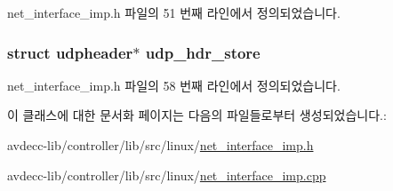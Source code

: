 net\+\_\+interface\+\_\+imp.\+h 파일의 51 번째 라인에서 정의되었습니다.

\subsubsection[{\texorpdfstring{udp\+\_\+hdr\+\_\+store}{udp_hdr_store}}]{\setlength{\rightskip}{0pt plus 5cm}struct {\bf udpheader}$\ast$ udp\+\_\+hdr\+\_\+store\hspace{0.3cm}{\ttfamily [private]}}\hypertarget{classavdecc__lib_1_1net__interface__imp_a65cb4a1c57b7723f14a70a7a741c8160}{}\label{classavdecc__lib_1_1net__interface__imp_a65cb4a1c57b7723f14a70a7a741c8160}


net\+\_\+interface\+\_\+imp.\+h 파일의 58 번째 라인에서 정의되었습니다.



이 클래스에 대한 문서화 페이지는 다음의 파일들로부터 생성되었습니다.\+:\begin{DoxyCompactItemize}
\item 
avdecc-\/lib/controller/lib/src/linux/\hyperlink{linux_2net__interface__imp_8h}{net\+\_\+interface\+\_\+imp.\+h}\item 
avdecc-\/lib/controller/lib/src/linux/\hyperlink{linux_2net__interface__imp_8cpp}{net\+\_\+interface\+\_\+imp.\+cpp}\end{DoxyCompactItemize}
